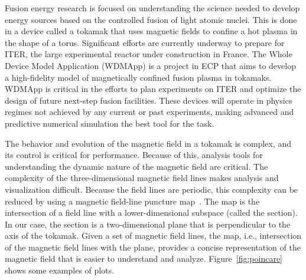 Fusion energy research is focused on understanding the science needed to develop energy sources based on the controlled fusion of light atomic nuclei. This is done in a device called a tokamak that uses magnetic fields to confine a hot plasma in the shape of a torus.
Significant efforts are currently underway to prepare for ITER, the large experimental reactor under construction in France.
The Whole Device Model Application (WDMApp) is a project in ECP that aims to develop a high-fidelity model of magnetically confined fusion plasma in tokamaks. 
WDMApp is critical in the efforts to plan experiments on ITER and optimize the design of future next-step fusion facilities. These devices will operate in physics regimes not achieved by any current or past experiments, making advanced and predictive numerical simulation the best tool for the task.




The behavior and evolution of the magnetic field in a tokamak is complex, and its control is critical for performance.
Because of this, analysis tools for understanding the dynamic nature of the magnetic field are critical.
The complexity of the three-dimensional magnetic field lines makes analysis and visualization difficult.
Because the field lines are periodic, this complexity can be reduced by using a \poincare magnetic field-line puncture map~\cite{Sanderson2010}. 
The \poincare map is the intersection of a field line with a lower-dimensional subspace (called the \poincare section).
In our case, the \poincare section is a two-dimensional plane that is perpendicular to the axis of the tokamak.
Given a set of magnetic field lines, the \poincare map, i.e., intersection of the magnetic field lines with the plane, provides a concise 
representation of the magnetic field that is easier to understand and analyze.
Figure~\ref{fig:poincare} shows some examples of \poincare plots.

